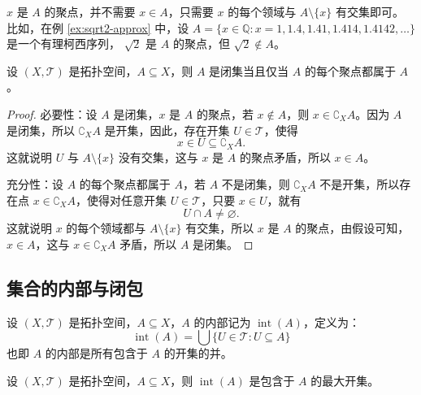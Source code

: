 \begin{note}
    $x$ 是 $A$ 的聚点，并不需要 $x\in A$，只需要 $x$ 的每个领域与 $A\setminus\{x\}$ 有交集即可。
    比如，在例 \ref{ex:sqrt2-approx} 中，设 $A=\{x\in\mathbb{Q}:x=1,1.4,1.41,1.414,1.4142,\ldots\}$ 是一个有理柯西序列，
    $\sqrt{2}$ 是 $A$ 的聚点，但 $\sqrt{2}\notin A$。
\end{note}
\vspace{1em}

\begin{proposition}[闭集判定的充要条件]
    设 $(X,\mathcal{T})$ 是拓扑空间，$A\subseteq X$，则 $A$ 是闭集当且仅当 $A$ 的每个聚点都属于 $A$。
    \label{prop:closed_set_criteria_1}
\end{proposition}

\begin{proof}
    必要性：设 $A$ 是闭集，$x$ 是 $A$ 的聚点，若 $x\notin A$，则 $x\in \complement_X A$。因为 $A$ 是闭集，所以 $\complement_X A$ 是开集，因此，存在开集 $U\in \mathcal{T}$，使得
    \[
        x\in U \subseteq \complement_X A.
    \]
    这就说明 $U$ 与 $A\setminus\{x\}$ 没有交集，这与 $x$ 是 $A$ 的聚点矛盾，所以 $x\in A$。

    充分性：设 $A$ 的每个聚点都属于 $A$，若 $A$ 不是闭集，则 $\complement_X A$ 不是开集，所以存在点 $x\in \complement_X A$，使得对任意开集 $U\in \mathcal{T}$，只要 $x\in U$，就有
    \[
        U \cap A \neq \varnothing.
    \]
    这就说明 $x$ 的每个领域都与 $A\setminus\{x\}$ 有交集，所以 $x$ 是 $A$ 的聚点，由假设可知，$x\in A$，这与 $x\in \complement_X A$ 矛盾，所以 $A$ 是闭集。
\end{proof}

\vspace{1em}

\subsection{集合的内部与闭包}

\begin{definition}[集合的内部与闭包]
    设 $(X,\mathcal{T})$ 是拓扑空间，$A\subseteq X$，$A$ 的内部记为 $\operatorname{int}(A)$，定义为：
    \[
        \operatorname{int}(A) = \bigcup \{U \in \mathcal{T} : U \subseteq A\} 
    \]
    也即 $A$ 的内部是所有包含于 $A$ 的开集的并。
    \label{def:set_interior}
\end{definition}

\begin{proposition}
    设 $(X,\mathcal{T})$ 是拓扑空间，$A\subseteq X$，则 $\operatorname{int}(A)$ 是包含于 $A$ 的最大开集。
\end{proposition}
\vspace{1em}

